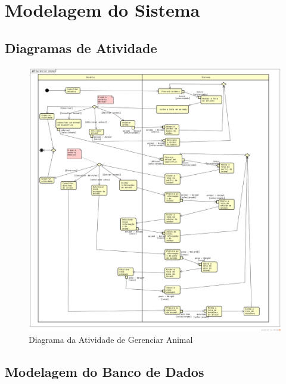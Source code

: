 \documentclass[12pt]{article}
\begin{document}
\begin{titlepage}
\begin{figure}[!h]
\begin{center}

\end{center}
\end{figure}


\newpage
\section{Modelagem do Sistema}

\subsection{Diagramas de Atividade}

\begin{figure}[!h]
\begin{center}
\caption{Diagrama da Atividade de Gerenciar Animal}
\includegraphics[width=6in]{img/atividadegerenciarboi.png}

\end{center}
\end{figure}

\subsection{Modelagem do Banco de Dados}


\end{titlepage}
\end{document}
